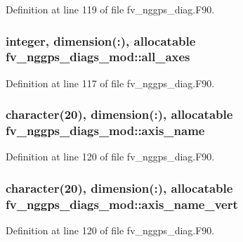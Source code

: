 Definition at line 119 of file fv\-\_\-nggps\-\_\-diag.\-F90.

\subsubsection[{all\-\_\-axes}]{\setlength{\rightskip}{0pt plus 5cm}integer, dimension(\-:), allocatable fv\-\_\-nggps\-\_\-diags\-\_\-mod\-::all\-\_\-axes\hspace{0.3cm}{\ttfamily [private]}}\label{classfv__nggps__diags__mod_ad7f236d66e4b3d41e0501bd9693bdd9e}


Definition at line 117 of file fv\-\_\-nggps\-\_\-diag.\-F90.

\subsubsection[{axis\-\_\-name}]{\setlength{\rightskip}{0pt plus 5cm}character(20), dimension(\-:), allocatable fv\-\_\-nggps\-\_\-diags\-\_\-mod\-::axis\-\_\-name\hspace{0.3cm}{\ttfamily [private]}}\label{classfv__nggps__diags__mod_a9b3c6afd1c1d787a6025594b51ffbe41}


Definition at line 120 of file fv\-\_\-nggps\-\_\-diag.\-F90.

\subsubsection[{axis\-\_\-name\-\_\-vert}]{\setlength{\rightskip}{0pt plus 5cm}character(20), dimension(\-:), allocatable fv\-\_\-nggps\-\_\-diags\-\_\-mod\-::axis\-\_\-name\-\_\-vert\hspace{0.3cm}{\ttfamily [private]}}\label{classfv__nggps__diags__mod_aa890948022803ec69a3d017f66653db6}


Definition at line 120 of file fv\-\_\-nggps\-\_\-diag.\-F90.

